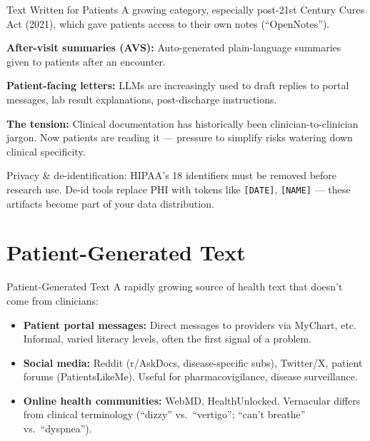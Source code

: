 \documentclass[aspectratio=169,11pt]{beamer}
\begin{document}
\begin{frame}{Text Written for Patients}
\small
A growing category, especially post-21st Century Cures Act (2021), which gave patients access to their own notes (``OpenNotes'').

\vspace{0.1em}
\textbf{After-visit summaries (AVS):} Auto-generated plain-language summaries given to patients after an encounter.

\vspace{0.1em}
\textbf{Patient-facing letters:} LLMs are increasingly used to draft replies to portal messages, lab result explanations, post-discharge instructions.

\pause
\vspace{0.1em}
\textbf{The tension:} Clinical documentation has historically been clinician-to-clinician jargon. Now patients are reading it --- pressure to simplify risks watering down clinical specificity.

\pause
\vspace{0.1em}
\alert{Privacy \& de-identification:} HIPAA's 18 identifiers must be removed before research use. De-id tools replace PHI with tokens like \texttt{[DATE]}, \texttt{[NAME]} --- these artifacts become part of your data distribution.
\end{frame}

\section{Patient-Generated Text}

\begin{frame}{Patient-Generated Text}
A rapidly growing source of health text that doesn't come from clinicians:

\vspace{0.15em}
\begin{itemize}[<+->]\setlength\itemsep{0.02em}
  \item \textbf{Patient portal messages:} Direct messages to providers via MyChart, etc. Informal, varied literacy levels, often the first signal of a problem.
  \item \textbf{Social media:} Reddit (r/AskDocs, disease-specific subs), Twitter/X, patient forums (PatientsLikeMe). Useful for pharmacovigilance, disease surveillance.
  \item \textbf{Online health communities:} WebMD, HealthUnlocked. Vernacular differs from clinical terminology (``dizzy'' vs.\ ``vertigo''; ``can't breathe'' vs.\ ``dyspnea'').
\end{itemize}

\end{frame}
\end{document}

